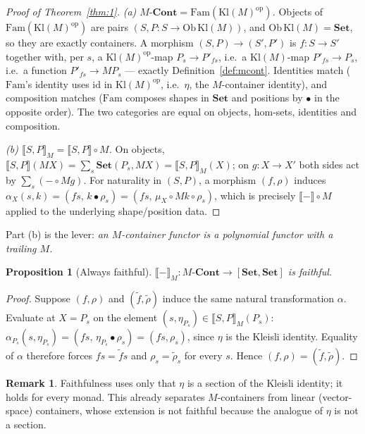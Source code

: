 \documentclass[11pt]{amsart}
\theoremstyle{plain}
\newtheorem{proposition}[theorem]{Proposition}
\theoremstyle{definition}
\newtheorem{remark}[theorem]{Remark}
\newcommand{\Set}{\mathbf{Set}}
\newcommand{\Cont}{\mathbf{Cont}}
\newcommand{\Fam}{\mathrm{Fam}}
\newcommand{\Kl}{\mathrm{Kl}}
\newcommand{\op}{\mathrm{op}}
\newcommand{\ext}[1]{\llbracket #1 \rrbracket}
\newcommand{\extM}[1]{\llbracket #1 \rrbracket_{M}}
\newcommand{\id}{\mathrm{id}}
\begin{document}
\begin{proof}[Proof of Theorem~\ref{thm:1}]
\emph{(a) $M\text{-}\Cont=\Fam(\Kl(M)^{\op})$.} Objects of $\Fam(\Kl(M)^{\op})$ are pairs
$(S,P\colon S\to\mathrm{Ob}\,\Kl(M))$, and $\mathrm{Ob}\,\Kl(M)=\Set$, so they are exactly
containers. A morphism $(S,P)\to(S',P')$ is $f\colon S\to S'$ together with, per $s$, a
$\Kl(M)^{\op}$-map $P_s\to P'_{fs}$, i.e.\ a $\Kl(M)$-map $P'_{fs}\to P_s$, i.e.\ a function
$P'_{fs}\to MP_s$ --- exactly Definition~\ref{def:mcont}. Identities match ($\Fam$'s identity uses
$\id$ in $\Kl(M)^{\op}$, i.e.\ $\eta$, the $M$-container identity), and composition matches
($\Fam$ composes shapes in $\Set$ and positions by $\bullet$ in the opposite order). The two
categories are equal on objects, hom-sets, identities and composition.

\emph{(b) $\extM{S,P}=\ext{S,P}\circ M$.} On objects,
$\ext{S,P}(MX)=\sum_s\Set(P_s,MX)=\extM{S,P}(X)$; on $g\colon X\to X'$ both sides act by
$\sum_s(-\circ Mg)$. For naturality in $(S,P)$, a morphism $(f,\rho)$ induces
$\alpha_X(s,k)=(fs,\,k\bullet\rho_s)=(fs,\,\mu_X\circ Mk\circ\rho_s)$, which is precisely $\ext{-}\circ
M$ applied to the underlying shape/position data.
\end{proof}

Part (b) is the lever: \emph{an $M$-container functor is a polynomial functor with a trailing $M$.}

\begin{proposition}[Always faithful]\label{prop:faithful}
$\extM{-}\colon M\text{-}\Cont\to[\Set,\Set]$ is faithful.
\end{proposition}

\begin{proof}
Suppose $(f,\rho)$ and $(\tilde f,\tilde\rho)$ induce the same natural transformation $\alpha$.
Evaluate at $X=P_s$ on the element $(s,\eta_{P_s})\in\extM{S,P}(P_s)$:
$\alpha_{P_s}(s,\eta_{P_s})=(fs,\,\eta_{P_s}\bullet\rho_s)=(fs,\rho_s)$, since $\eta$ is the Kleisli
identity. Equality of $\alpha$ therefore forces $fs=\tilde fs$ and $\rho_s=\tilde\rho_s$ for every
$s$. Hence $(f,\rho)=(\tilde f,\tilde\rho)$.
\end{proof}

\begin{remark}
Faithfulness uses only that $\eta$ is a section of the Kleisli identity; it holds for every monad.
This already separates $M$-containers from linear (vector-space) containers, whose extension is not
faithful because the analogue of $\eta$ is not a section.
\end{remark}
\end{document}
